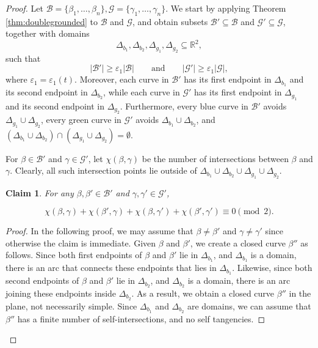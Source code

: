 \documentclass[11pt]{article}
\theoremstyle{plain}
\newtheorem{claim}[theorem]{Claim}
\theoremstyle{definition}
\theoremstyle{remark}
\begin{document}
\begin{proof}

Let $\mathcal B=\{\beta_1,\ldots,\beta_n\}, \mathcal G=\{\gamma_1,\ldots,\gamma_n\}.$   We start by applying Theorem \ref{thm:doublegrounded} to $\mathcal B$ and $\mathcal G$, and obtain subsets \(\mathcal{B}'\subseteq \mathcal{B}\) and \(\mathcal{G}'\subseteq \mathcal{G}\), together with domains
\[
\Delta_{b_1},\Delta_{b_2},\Delta_{g_1},\Delta_{g_2}\subseteq \mathbb{R}^2,
\]
such that
\[
|\mathcal{B}'|\ge \varepsilon_1|\mathcal{B}|
\qquad\text{and}\qquad
|\mathcal{G}'|\ge \varepsilon_1|\mathcal{G}|,
\]
where $\varepsilon_1 = \varepsilon_1(t).$  Moreover, each curve in \(\mathcal{B}'\) has its first endpoint in \(\Delta_{b_1}\) and its second endpoint in \(\Delta_{b_2}\), while each curve in \(\mathcal{G}'\) has its first endpoint in \(\Delta_{g_1}\) and its second endpoint in \(\Delta_{g_2}\). Furthermore, every blue curve in \(\mathcal{B}'\) avoids \(\Delta_{g_1}\cup\Delta_{g_2}\), every green curve in \(\mathcal{G}'\) avoids \(\Delta_{b_1}\cup\Delta_{b_2}\), and $(\Delta_{b_1}\cup\Delta_{b_2}) \cap (\Delta_{g_1}\cup\Delta_{g_2}) = \emptyset$.


For \(\beta\in\mathcal B'\) and \(\gamma\in\mathcal G'\), let \(\chi(\beta,\gamma)\) be the number of intersections between \(\beta\) and \(\gamma\).  Clearly, all such intersection points lie outside of $\Delta_{b_1}\cup\Delta_{b_2} \cup \Delta_{g_1}\cup\Delta_{g_2}$.

\medskip

\begin{claim}
For any \(\beta,\beta'\in\mathcal B'\) and \(\gamma,\gamma'\in\mathcal G'\),

\[\chi(\beta,\gamma)+\chi(\beta',\gamma)+\chi(\beta,\gamma')+\chi(\beta',\gamma') \equiv 0 \pmod 2.\]
\end{claim}

\begin{proof}
In the following proof, we may assume that $\beta\neq \beta'$ and $\gamma \neq \gamma'$ since otherwise the claim is immediate. Given $\beta$ and $\beta'$, we create a closed curve $\beta''$ as follows.  Since both first endpoints of $\beta$ and $\beta'$ lie in $\Delta_{b_1}$, and $\Delta_{b_1}$ is a domain, there is an arc that connects these endpoints that lies in $\Delta_{b_1}$.  Likewise, since both second endpoints of \(\beta\) and \(\beta'\) lie in \(\Delta_{b_2}\), and \(\Delta_{b_2}\) is a domain, there is an arc joining these endpoints inside \(\Delta_{b_2}\).   As a result, we obtain a closed curve $\beta''$ in the plane, not necessarily simple.  Since $\Delta_{b_1}$ and $\Delta_{b_2}$ are domains, we can assume that $\beta''$ has a finite number of self-intersections, and no self tangencies.  



\end{proof}
\end{proof}
\end{document}
